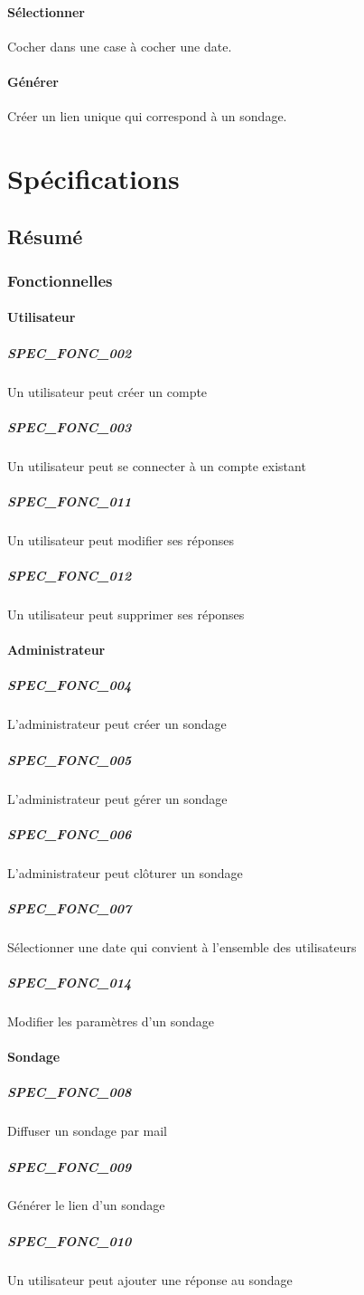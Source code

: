 \documentclass[]{report}
\begin{document}
\paragraph{Sélectionner} Cocher dans une case à cocher une date.
\paragraph{Générer} Créer un lien unique qui correspond à un sondage.

\section{Spécifications}

\subsection{Résumé}
\subsubsection{Fonctionnelles}

\paragraph{Utilisateur}
\subparagraph{SPEC\_FONC\_002} Un utilisateur peut créer un compte
\subparagraph{SPEC\_FONC\_003} Un utilisateur peut se connecter à un compte existant
\subparagraph{SPEC\_FONC\_011} Un utilisateur peut modifier ses réponses
\subparagraph{SPEC\_FONC\_012} Un utilisateur peut supprimer ses réponses

\paragraph{Administrateur}
\subparagraph{SPEC\_FONC\_004} L’administrateur peut créer un sondage
\subparagraph{SPEC\_FONC\_005} L’administrateur peut gérer un sondage
\subparagraph{SPEC\_FONC\_006} L’administrateur peut clôturer un sondage
\subparagraph{SPEC\_FONC\_007} Sélectionner une date qui convient à l’ensemble des utilisateurs
\subparagraph{SPEC\_FONC\_014} Modifier les paramètres d’un sondage

\paragraph{Sondage}
\subparagraph{SPEC\_FONC\_008} Diffuser un sondage par mail
\subparagraph{SPEC\_FONC\_009} Générer le lien d’un sondage
\subparagraph{SPEC\_FONC\_010} Un utilisateur peut ajouter une réponse au sondage
\end{document}
